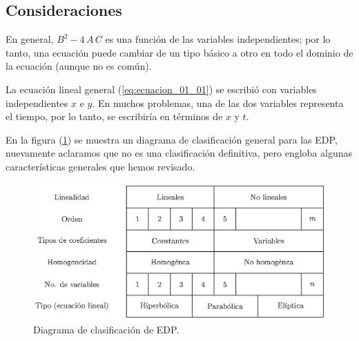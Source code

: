 \subsection*{Consideraciones}

En general, $B^{2} - 4 \, A \, C$ es una función de las variables independientes; por lo tanto, una ecuación puede cambiar de un tipo básico a otro en todo el dominio de la ecuación (aunque no es común).
\par
La ecuación lineal general (\ref{eq:ecuacion_01_01}) se escribió con variables independientes $x$ e $y$. En muchos problemas, una de las dos variables representa el tiempo, por lo tanto, se escribiría en términos de $x$ y $t$.
\par
En la figura (\ref{fig:figura_clasificacion_EDP}) se muestra un diagrama de clasificación general para las EDP, nuevamente aclaramos que no es una clasificación definitiva, pero engloba algunas características generales que hemos revisado.
\begin{figure}[H]
    \centering
    \includegraphics[scale=0.87]{Imagenes/Cuadro_Clasificacion_EDP.eps}
    \caption{Diagrama de clasificación de EDP.}
    \label{fig:figura_clasificacion_EDP}
\end{figure}
